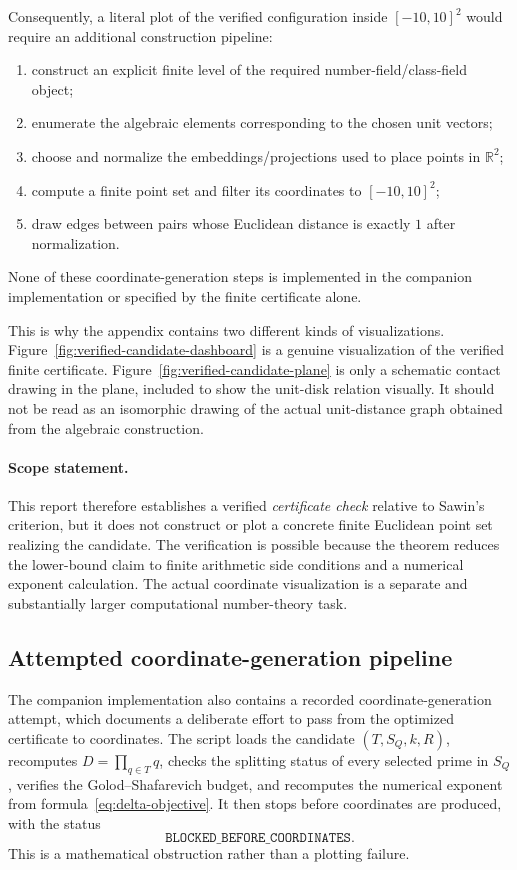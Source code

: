 \documentclass[a4paper,12pt]{article}
\begin{document}
Consequently, a literal plot of the verified configuration inside $[-10,10]^2$ would require an additional construction pipeline:
\begin{enumerate}
\item construct an explicit finite level of the required number-field/class-field object;
\item enumerate the algebraic elements corresponding to the chosen unit vectors;
\item choose and normalize the embeddings/projections used to place points in $\mathbb{R}^2$;
\item compute a finite point set and filter its coordinates to $[-10,10]^2$;
\item draw edges between pairs whose Euclidean distance is exactly $1$ after normalization.
\end{enumerate}
None of these coordinate-generation steps is implemented in the companion implementation or specified by the finite certificate alone.

This is why the appendix contains two different kinds of visualizations.  Figure~\ref{fig:verified-candidate-dashboard} is a genuine visualization of the verified finite certificate.  Figure~\ref{fig:verified-candidate-plane} is only a schematic contact drawing in the plane, included to show the unit-disk relation visually.  It should not be read as an isomorphic drawing of the actual unit-distance graph obtained from the algebraic construction.

\paragraph{Scope statement.}
This report therefore establishes a verified \emph{certificate check} relative to Sawin's criterion, but it does not construct or plot a concrete finite Euclidean point set realizing the candidate.  The verification is possible because the theorem reduces the lower-bound claim to finite arithmetic side conditions and a numerical exponent calculation.  The actual coordinate visualization is a separate and substantially larger computational number-theory task.


\subsection*{Attempted coordinate-generation pipeline}

The companion implementation also contains a recorded coordinate-generation attempt, which documents a deliberate effort to pass from the optimized certificate to coordinates.  The script loads the candidate $(T,S_Q,k,R)$, recomputes $D=\prod_{q\in T}q$, checks the splitting status of every selected prime in $S_Q$, verifies the Golod--Shafarevich budget, and recomputes the numerical exponent from formula~\eqref{eq:delta-objective}.  It then stops before coordinates are produced, with the status
\[
\texttt{BLOCKED\_BEFORE\_COORDINATES}.
\]
This is a mathematical obstruction rather than a plotting failure.
\end{document}
